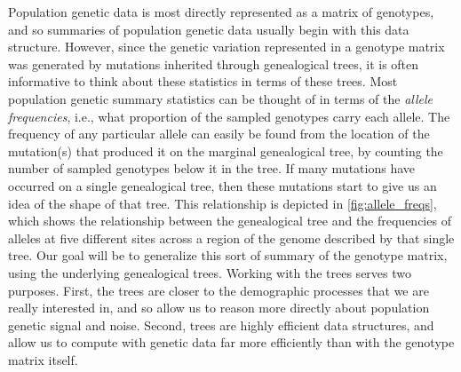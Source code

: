 \documentclass{article}
\begin{document}
Population genetic data is most directly represented as a matrix of genotypes,
and so summaries of population genetic data usually begin with this data structure.
However, since the genetic variation represented in a genotype matrix
was generated by mutations inherited through genealogical trees,
it is often informative to think about these statistics in terms of these trees.
Most population genetic summary statistics can be thought of in terms of the \emph{allele frequencies},
i.e., what proportion of the sampled genotypes carry each allele.
The frequency of any particular allele
can easily be found from the location of the mutation(s) that produced it
on the marginal genealogical tree,
by counting the number of sampled genotypes below it in the tree.
If many mutations have occurred on a single genealogical tree,
then these mutations start to give us an idea of the shape of that tree.
This relationship is depicted in \autoref{fig:allele_freqs},
which shows the relationship between the genealogical tree
and the frequencies of alleles at five different sites across a region of the genome
described by that single tree.
Our goal will be to generalize this sort of summary of the genotype matrix,
using the underlying genealogical trees.
Working with the trees serves two purposes.
First, the trees are closer to the demographic processes that we are really interested in,
and so allow us to reason more directly about population genetic signal and noise.
Second, trees are highly efficient data structures,
and allow us to compute with genetic data far more efficiently than with the genotype matrix itself.
\end{document}
